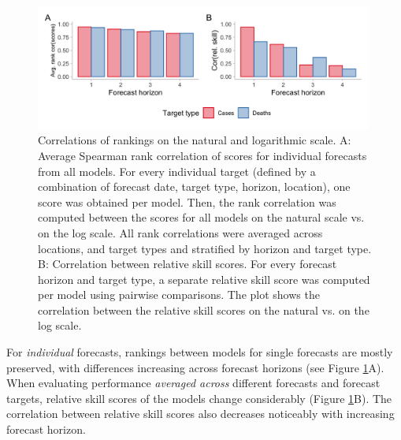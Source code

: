 \documentclass{article}
\begin{document}
\begin{figure}[h!]
    \centering
    \includegraphics[width=0.99\textwidth]{output/figures/HUB-correlations.png}
    \caption{Correlations of rankings on the natural and logarithmic scale. A: Average Spearman rank correlation of scores for individual forecasts from all models. For every individual target (defined by a combination of forecast date, target type, horizon, location), one score was obtained per model. Then, the rank correlation was computed between the scores for all models on the natural scale vs. on the log scale. All rank correlations were averaged across locations, and target types and stratified by horizon and target type. B: Correlation between relative skill scores. For every forecast horizon and target type, a separate relative skill score was computed per model using pairwise comparisons. The plot shows the correlation between the relative skill scores on the natural vs. on the log scale.}
    \label{fig:HUB-cors}
\end{figure}

For \textit{individual} forecasts, rankings between models for single forecasts are mostly preserved, with differences increasing across forecast horizons (see Figure \ref{fig:HUB-cors}A). When evaluating performance \textit{averaged across} different forecasts and forecast targets, relative skill scores of the models change considerably (Figure \ref{fig:HUB-cors}B). The correlation between relative skill scores also decreases noticeably with increasing forecast horizon. 
\end{document}
